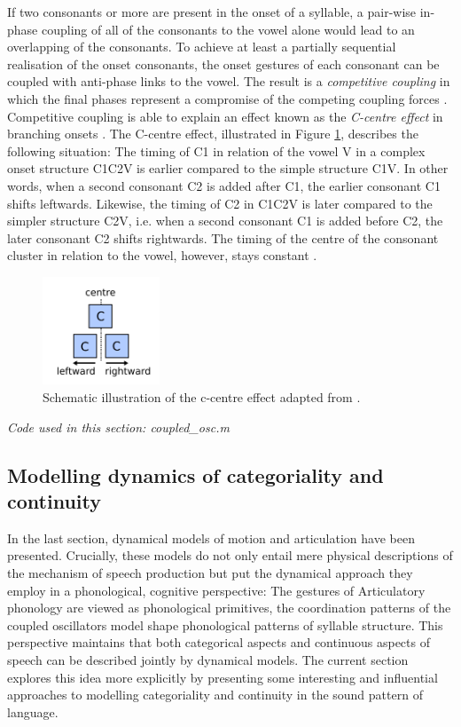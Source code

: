If two consonants or more are present in the onset of a syllable, a pair-wise in-phase coupling of all of the consonants to the vowel alone would lead to an overlapping of the consonants. To achieve at least a partially sequential realisation of the onset consonants, the onset gestures of each consonant can be coupled with anti-phase links to the vowel. The result is a \emph{competitive coupling} in which the final phases represent a compromise of the competing coupling forces \citep{Nam2007, Saltzmanetal2008, Goldsteinetal2009}. Competitive coupling is able to explain an effect known as the \emph{C-centre effect} in branching onsets \citep{BrowmanGoldstein1988, Byrd1995}. The C-centre effect, illustrated in Figure \ref{fig:c-centre}, describes the following situation: The timing of C1 in relation of the vowel V in a complex onset structure C1C2V is earlier compared to the simple structure C1V. In other words, when a second consonant C2 is added after C1, the earlier consonant C1 shifts leftwards. Likewise, the timing of C2 in C1C2V is later compared to the simpler structure C2V, i.e. when a second consonant C1 is added before C2, the later consonant C2 shifts rightwards. The timing of the centre of the consonant cluster in relation to the vowel, however, stays constant \citep{BrowmanGoldstein1988, Goldsteinetal2009}.

\begin{figure}[t]
\includegraphics[width=3.5cm]{figures/ch3/c_centre.pdf}
\caption{Schematic illustration of the c-centre effect adapted from \citet{HermesMückeGrice2013}.}
\label{fig:c-centre}
\end{figure}

\medskip\noindent \textit{Code used in this section: coupled\_osc.m}

\subsection{Modelling dynamics of categoriality and continuity}

In the last section, dynamical models of motion and articulation have been presented. Crucially, these models do not only entail mere physical descriptions of the mechanism of speech production but put the dynamical approach they employ in a phonological, cognitive perspective: The gestures of Articulatory phonology are viewed as phonological primitives, the coordination patterns of the coupled oscillators model shape phonological patterns of syllable structure. This perspective maintains that both categorical aspects and continuous aspects of speech can be described jointly by dynamical models. The current section explores this idea more explicitly by presenting some interesting and influential approaches to modelling categoriality and continuity in the sound pattern of language.

